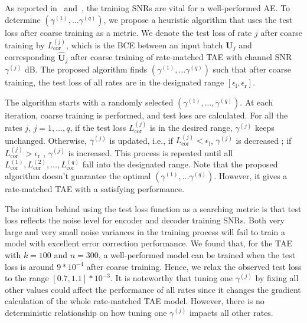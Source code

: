 \documentclass [PhD] {uclathes}
\begin{document}
As reported in~\cite{jamali_productae} and~\cite{jiang2019turbo}, the training SNRs are vital for a well-performed AE. %
To determine $(\gamma^{(1)},\ldots \gamma^{(q)})$, we propose a heuristic algorithm that uses the test loss after coarse training as a metric.
We denote the test loss of rate $j$ after coarse training by $L^{(j)}_{\text{cor}}$, which is the BCE between an input batch $\mathbf{U}_j$ and corresponding $\hat{\mathbf{U}}_j$ after coarse training of rate-matched TAE with channel SNR $\gamma^{(j)}$ dB. The proposed algorithm finds $\left(\gamma^{(1)},\ldots \gamma^{(q)}\right)$ such that after coarse training, the test loss of all rates are in the designated range $[\epsilon_\text{l}, \epsilon_\text{r}]$. 

The algorithm starts with a randomly selected $(\gamma^{(1)},\ldots, \gamma^{(q)})$. At each iteration, coarse training is performed, and test loss are calculated. For all the rates $j$, $j=1,\ldots,q$, if the test loss $L^{(j)}_{\text{cor}}$ is in the desired range, $\gamma^{(j)}$ keeps unchanged. Otherwise, $\gamma^{(j)}$ is updated, i.e., if $L^{(j)}_{\text{cor}}<\epsilon_{\text{l}}$, $\gamma^{(j)}$ is decreased ; if  $L^{(j)}_{\text{cor}}>\epsilon_{\text{r}}$ , $\gamma^{(j)}$ is increased. This process is repeated until all $L_{\text{cor}}^{(1)},L_{\text{cor}}^{(2)},\ldots,L_{\text{cor}}^{(q)}$ fall into the designated range.
Note that the proposed algorithm  doesn't guarantee the optimal $(\gamma^{(1)},\ldots \gamma^{(q)})$. However, it gives a rate-matched TAE with a satisfying performance. 

The intuition behind using the test loss function as a searching metric is that test loss reflects the noise level for encoder and decoder training SNRs. 
Both very large and very small noise variances in the training process will   fail to train a model with excellent error correction performance.  
We found that, for the TAE with $k=100$ and $n=300$, a well-performed model can be trained when the test loss is around $9*10^{-4}$ after coarse training. Hence, we relax the observed test loss to the range $[0.7,1.1]*10^{-3}$. It is noteworthy that tuning one $\gamma^{(j)}$ by fixing all other values could affect the performance of all rates since it changes the gradient calculation of the whole rate-matched TAE model. However, there is no deterministic relationship on how tuning one $\gamma^{(j)}$ impacts all other rates. 
\end{document}
